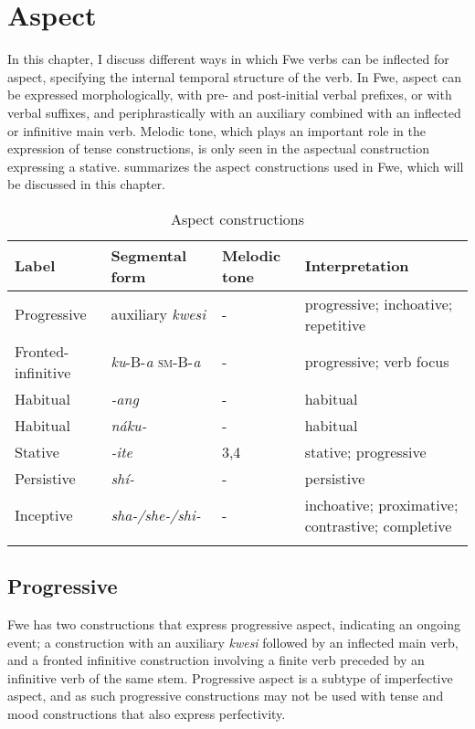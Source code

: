 \chapter{Aspect}
\label{bkm:Ref99112358}\hypertarget{Toc75352689}{}
In this chapter, I discuss different ways in which Fwe verbs can be inflected for aspect, specifying the internal temporal structure of the verb. In Fwe, aspect can be expressed morphologically, with pre- and post-initial verbal prefixes, or with verbal suffixes, and periphrastically with an auxiliary combined with an inflected or infinitive main verb. Melodic tone, which plays an important role in the expression of tense constructions, is only seen in the aspectual construction expressing a stative.  summarizes the aspect constructions used in Fwe, which will be discussed in this chapter.

\begin{table}
\label{bkm:Ref494478974}\caption{\label{tab:9:1}Aspect constructions}
\begin{tabularx}{\textwidth}{lllQ}
\lsptoprule
Label & Segmental form & Melodic tone & Interpretation\\
\midrule
Progressive & auxiliary \textit{kwesi} & - & progressive; inchoative; repetitive\\
Fronted-infinitive & \textit{ku}-B-\textit{a} \textsc{sm}-B-\textit{a} & - & progressive; verb focus\\
Habitual & \textit{-ang} & - & habitual\\
Habitual & {\itshape náku-} & - & habitual  \\
Stative & {\itshape -ite} & 3,4 & stative; progressive\\
Persistive & {\itshape shí-} & - & persistive\\
Inceptive & {\itshape sha-/she-/shi-} & - & inchoative; proximative; contrastive; completive\\
\lspbottomrule
\end{tabularx}
\end{table}
\section{Progressive}
\label{bkm:Ref445905308}\hypertarget{Toc75352690}{}
Fwe has two constructions that express progressive aspect, indicating an ongoing event; a construction with an auxiliary \textit{kwesi} followed by an inflected main verb, and a fronted infinitive construction involving a finite verb preceded by an infinitive verb of the same stem. Progressive aspect is a subtype of imperfective aspect, and as such progressive constructions may not be used with tense and mood constructions that also express perfectivity.

